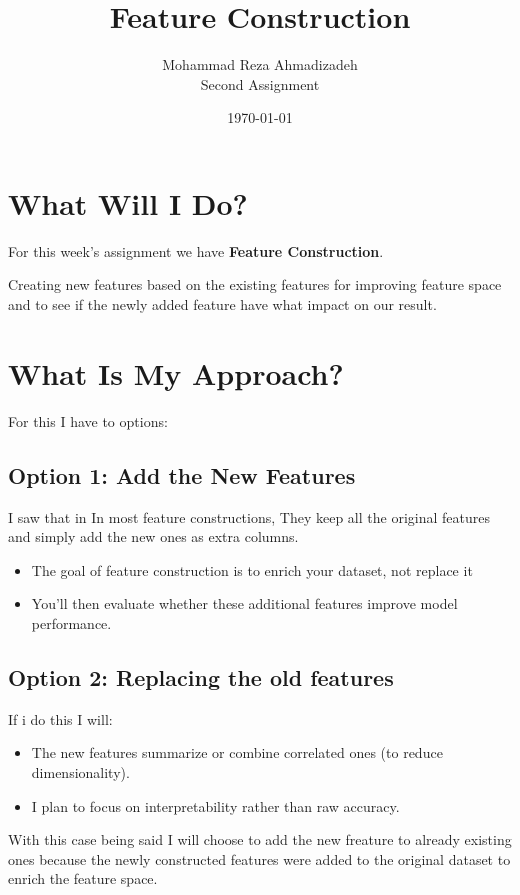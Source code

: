 \documentclass{article}
\title{\textbf{Feature Construction}}
\author{Mohammad Reza Ahmadizadeh\\Second Assignment}
\date{\today} %
\begin{document}
\maketitle

\section{What Will I Do?}

For this week's assignment we have \textbf{Feature Construction}.

Creating new features based on the existing features for improving feature space and to see if the
newly added feature have what impact on our result.

\section{What Is My Approach?}

For this I have to options:

\subsection*{Option 1: Add the New Features}
I saw that in In most feature constructions, They keep all the original features and simply add the new ones as extra columns.

\begin{itemize}
    \item The goal of feature construction is to enrich your dataset, not replace it
    \item You’ll then evaluate whether these additional features improve model performance.
\end{itemize}

\subsection*{Option 2: Replacing the old features}
If i do this I will:

\begin{itemize}
    \item The new features summarize or combine correlated ones (to reduce dimensionality).
    \item I plan to focus on interpretability rather than raw accuracy.
\end{itemize}

With this case being said I will choose to add the new freature to already existing ones because
the newly constructed features were added to the original dataset to enrich the feature space.
\end{document}
